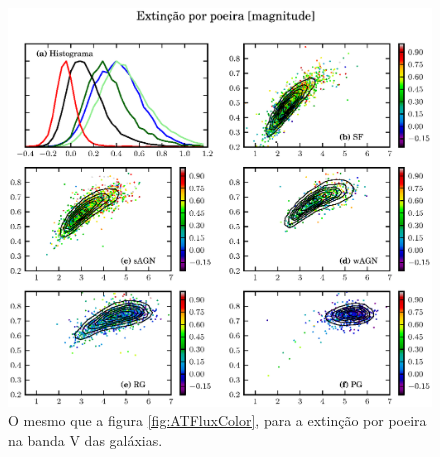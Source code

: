 \begin{figure}
	\includegraphics{figuras/uvcolor-color-AV-byclass.eps}
	\caption[Absorção por poeira no diagrama cor--cor UV.]
	{O mesmo que a figura \ref{fig:ATFluxColor}, para a extinção por
	poeira na banda V das galáxias.}
	\label{fig:AV}
\end{figure}



